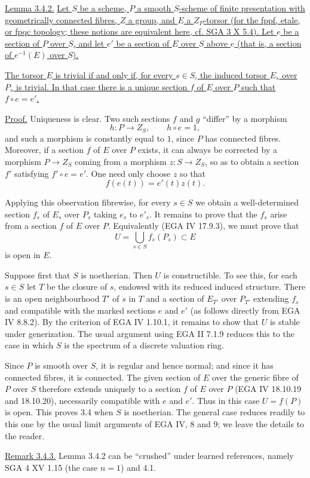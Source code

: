 \medskip
\noindent\underline{Lemma 3.4.2.}  \underline{Let $S$ be a scheme,
$P$ a smooth $S$-scheme of finite presentation with geometrically
connected fibres, $Z$ a group, and $E$ a $Z_P$-torsor (for the fppf,
etale, or fpqc topology; these notions are equivalent here, cf. SGA
3 X 5.4).  Let $e$ be a section of $P$ over $S$, and let $e'$ be a
section of $E$ over $S$ above $e$ (that is, a section of $e^{-1}(E)$
over $S$).}

\underline{The torsor $E$ is trivial if and only if, for every
$s\in S$, the induced torsor $E_s$ over $P_s$ is trivial.  In that
case there is a unique section $f$ of $E$ over $P$ such that
$f\circ e=e'$.}

\noindent\underline{Proof.}  Uniqueness is clear.  Two such sections
$f$ and $g$ ``differ'' by a morphism
\[
 h:P\longrightarrow Z_S,
 \qquad h\circ e=1,
\]
and such a morphism is constantly equal to $1$, since $P$ has
connected fibres.  Moreover, if a section $f$ of $E$ over $P$
exists, it can always be corrected by a morphism
$P\longrightarrow Z_S$ coming from a morphism $z:S\longrightarrow
Z_S$, so as to obtain a section $f'$ satisfying $f'\circ e=e'$.
One need only choose $z$ so that
\[
 f(e(t))=e'(t)z(t).
\]

Applying this observation fibrewise, for every $s\in S$ we obtain a
well-determined section $f_s$ of $E_s$ over $P_s$ taking $e_s$ to
$e'_s$.  It remains to prove that the $f_s$ arise from a section $f$
of $E$ over $P$.  Equivalently (EGA IV 17.9.3), we must prove that
\[
 U=\bigcup_{s\in S}f_s(P_s)\subset E
\]
is open in $E$.

Suppose first that $S$ is noetherian.  Then $U$ is constructible.  To
see this, for each $s\in S$ let $T$ be the closure of $s$, endowed
with its reduced induced structure.  There is an open neighbourhood
$T'$ of $s$ in $T$ and a section of $E_{T'}$ over $P_{T'}$ extending
$f_s$ and compatible with the marked sections $e$ and $e'$ (as
follows directly from EGA IV 8.8.2).  By the criterion of EGA IV
1.10.1, it remains to show that $U$ is stable under generization.
The usual argument using EGA II 7.1.9 reduces this to the case in
which $S$ is the spectrum of a discrete valuation ring.

Since $P$ is smooth over $S$, it is regular and hence normal; and
since it has connected fibres, it is connected.  The given section
of $E$ over the generic fibre of $P$ over $S$ therefore extends
uniquely to a section $f$ of $E$ over $P$ (EGA IV 18.10.19 and
18.10.20), necessarily compatible with $e$ and $e'$.  Thus in this
case $U=f(P)$ is open.  This proves 3.4 when $S$ is noetherian.  The
general case reduces readily to this one by the usual limit
arguments of EGA IV, 8 and 9; we leave the details to the reader.

\medskip
\noindent\underline{Remark 3.4.3.}  Lemma 3.4.2 can be ``crushed''
under learned references, namely SGA 4 XV 1.15 (the case $n=1$) and
4.1.


